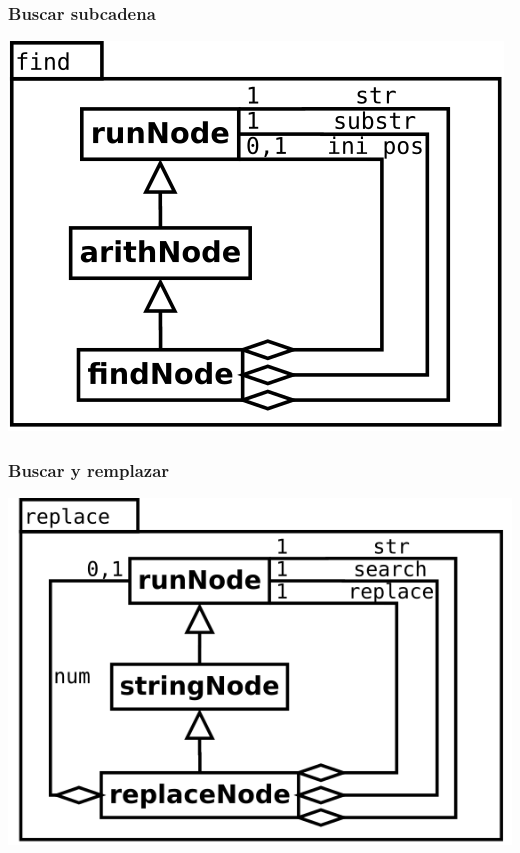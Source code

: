 \subsubsection {Buscar subcadena}
\begin{center}
\includegraphics[scale=0.4]{find.png} \\
\end{center}

\subsubsection {Buscar y remplazar}
\begin{center}
\includegraphics[scale=0.4]{replace.png} \\
\end{center}

